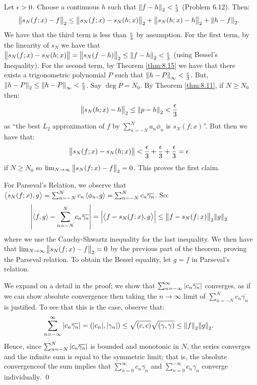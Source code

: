 \begin{nproof}
    Let $\epsilon > 0$. Choose a continuous $h$ such that $\norm{f- h}_2 < \frac{\epsilon}{3}$ (Problem 6.12). Then:
    \begin{align*}
        \norm{s_N(f;x) - f}_2 \leq \norm{s_N(f;x) - s_N(h;x)}_2 + \norm{s_N(h;x) - h}_2 + \norm{h - f}_2.
    \end{align*}
    We have that the third term is less than $\frac{\epsilon}{3}$ by assumption. For the first term, by the linearity of $s_N$ we have that $\norm{s_N(f;x) - s_N(h;x)} = \norm{s_N(f - h)}_2 \leq \norm{f-h}_2 < \frac{\epsilon}{3}$ (using Bessel's Inequality). For the second term, by Theorem \ref{thm:8.15} we have that there exists a trigonometric polynomial $P$ such that $\norm{h - P}_\infty < \frac{\epsilon}{3}$. But, $\norm{h - P}_2 \leq \norm{h - P}_\infty < \frac{\epsilon}{3}$. Say $\deg P = N_0$. By Theorem \ref{thm:8.11}, if $N \geq N_0$ then:
    \begin{align*}
        \norm{s_N(h;x) - h}_2 \leq \norm{p - h}_2 < \frac{\epsilon}{3}
    \end{align*}
    as ``the best $L_2$ approximation of $f$ by $\sum_{n= -N}^N a_n\phi_n$ is $s_N(f;x)$''. But then we have that:
    \begin{align*}
        \norm{s_N(f;x) - s_N(h;x)} < \frac{\epsilon}{3} + \frac{\epsilon}{3} + \frac{\epsilon}{3} = \epsilon
    \end{align*}
    if $N \geq N_0$ so $\lim_{N \rightarrow \infty}\norm{s_N(f;x) - f}_2 = 0$. This proves the first claim.

    For Parseval's Relation, we observe that $\left< s_N(f;x), g \right> = \sum_{n=-N}^N c_n \left< \phi_n, g \right> = \sum_{n=-N}^N c_n \overline{\gamma_n}$. So:
    \begin{align*}
        \abs{\left< f, g \right> - \sum_{n=-N}^N c_n \overline{\gamma_n}} = \abs{\left< f - s_N(f;x), g \right>} \leq \norm{f - s_N(f;x)}_2\norm{g}_2
    \end{align*}
    where we use the Cauchy-Shwartz inequality for the last inequality. We then have that $\lim_{N \rightarrow \infty}\norm{s_N(f;x) - f}_2 = 0$ by the previous part of the theorem, proving the Parseval relation. To obtain the Bessel equality, let $g = f$ in Parseval's relation.

    We expand on a detail in the proof; we show that $\sum_{n=-\infty}^\infty \abs{c_n\overline{\gamma_n}}$ converges, as if we can show absolute convergence then taking the $n \rightarrow \infty$ limit of $\sum_{n=-N}^N c_n\overline{\gamma_n}$ is justified. To see that this is the case, observe that:
    \begin{align*}
        \sum_{n=-\infty}^\infty \abs{c_n\overline{\gamma_n}} = (\abs{c_n}, \abs{\gamma_n}) \leq \sqrt{(c, c)}\sqrt{(\gamma, \gamma)} \leq \norm{f}_2\norm{g}_2.
    \end{align*}
    Hence, since $\sum_{n=-N}^N \abs{c_n\overline{\gamma_n}}$ is bounded and monotonic in $N$, the series converges and the infinite sum is equal to the symmetric limit; that is, the absolute convergenceof the sum implies that $\sum_{n=0}^\infty c_n\overline{\gamma_n}$ and $\sum_{n=0}^{-\infty}c_n\overline{\gamma_n}$ converge individually. \qed
\end{nproof}